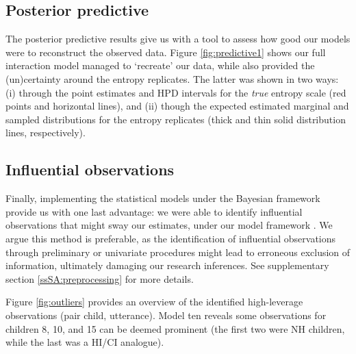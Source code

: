 \subsection{Posterior predictive} \label{sS:results_posterior}
%
The posterior predictive results give us with a tool to assess how good our models were to reconstruct the observed data. Figure \ref{fig:predictive1} shows our full interaction model managed to `recreate' our data, while also provided the (un)certainty around the entropy replicates. The latter was shown in two ways: (i) through the point estimates and HPD intervals for the \textit{true} entropy scale (red points and horizontal lines), and (ii) though the expected estimated marginal and sampled distributions for the entropy replicates (thick and thin solid distribution lines, respectively).
%
%
\subsection{Influential observations} \label{sS:results_outliers}
%
Finally, implementing the statistical models under the Bayesian framework provide us with one last advantage: we were able to identify influential observations that might sway our estimates, under our model framework \citep{McElreath_2020}. We argue this method is preferable, as the identification of influential observations through preliminary or univariate procedures might lead to erroneous exclusion of information, ultimately damaging our research inferences. See supplementary section \ref{ssSA:preprocessing} for more details.

Figure \ref{fig:outliers} provides an overview of the identified high-leverage observations (pair child, utterance). Model ten reveals some observations for children 8, 10, and 15 can be deemed prominent (the first two were NH children, while the last was a HI/CI analogue). 

